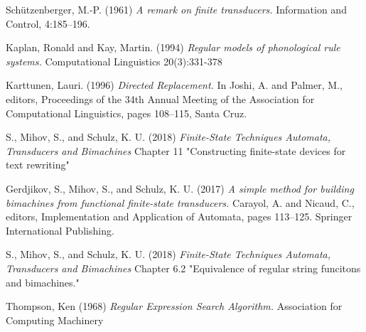 \documentclass[12pt, oneside]{article}
\theoremstyle{definition}
\begin{document}
\pagebreak
\begin{thebibliography}{9}
	
	Schützenberger, M.-P. (1961)
	\textit{A remark on finite transducers.} 
	Information and Control, 4:185–196.

	Kaplan, Ronald and Kay, Martin. (1994)
	\textit{Regular models of phonological rule systems.}
	Computational Linguistics 20(3):331-378

	Karttunen, Lauri. (1996)
	\textit{Directed Replacement.}
	In Joshi, A. and Palmer, M., editors, Proceedings of the 34th Annual Meeting of the Association for Computational Linguistics, pages 108–115, Santa Cruz.

	S., Mihov, S., and Schulz, K. U. (2018)
	\textit{Finite-State Techniques Automata, Transducers and Bimachines}
	Chapter 11 "Constructing finite-state devices for text rewriting"

	Gerdjikov, S., Mihov, S., and Schulz, K. U. (2017)
	\textit{A simple method for building bimachines from functional finite-state transducers.} 
	Carayol, A. and Nicaud, C., editors, Implementation and Application of Automata, pages 113–125. Springer International Publishing.

	S., Mihov, S., and Schulz, K. U. (2018)
	\textit{Finite-State Techniques Automata, Transducers and Bimachines}
	Chapter 6.2 "Equivalence of regular string funcitons and bimachines."

	Thompson, Ken (1968) 
	\textit{Regular Expression Search Algorithm.} 
	Association for Computing Machinery

\end{thebibliography}	
\end{document}
